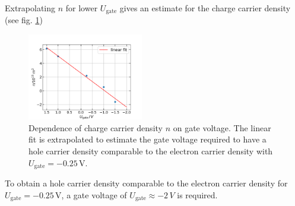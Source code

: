 Extrapolating $n$ for lower $U_\text{gate}$ gives an estimate for the charge carrier density (see fig. \ref{fig:extrapolating})
\begin{figure}[h]
    \centering
    \includegraphics[width=0.45\textwidth]{../Images/extrapolatingN.png}
    \caption{
        Dependence of charge carrier density $n$ on gate voltage.
        The linear fit is extrapolated to estimate the gate voltage required to have a hole carrier density comparable to the electron carrier density with $U_\text{gate} = -0.25\,\text{V}$.}
    \label{fig:extrapolating}
\end{figure}
To obtain a hole carrier density comparable to the electron carrier density for $U_\text{gate} = -0.25\,\text{V}$,
a gate voltage of $U_\text{gate} \approx -2\,V$ is required.
